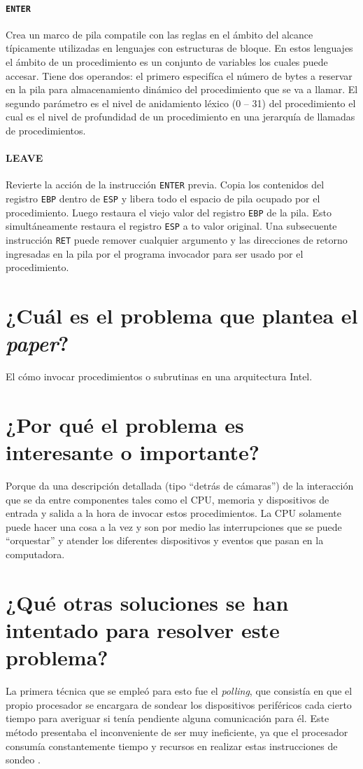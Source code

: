 \paragraph{\texttt{ENTER}}  
Crea un marco de pila compatile con las reglas en el ámbito del alcance típicamente utilizadas en lenguajes con estructuras de bloque. En estos lenguajes el ámbito de un procedimiento es un conjunto de variables los cuales puede accesar. Tiene dos operandos: el primero especifíca el número de bytes a reservar en la pila para almacenamiento dinámico del procedimiento que se va a llamar. El segundo parámetro es el nivel de anidamiento léxico (0 -- 31) del procedimiento el cual es el nivel de profundidad de un procedimiento en una jerarquía de llamadas de procedimientos.

\paragraph{LEAVE}
Revierte la acción de la instrucción \texttt{ENTER} previa. Copia los contenidos del registro \texttt{EBP} dentro de \texttt{ESP} y libera todo el espacio de pila ocupado por el procedimiento. Luego restaura el viejo valor del registro \texttt{EBP} de la pila. Esto simultáneamente restaura el registro \texttt{ESP} a to valor original. Una subsecuente instrucción \texttt{RET} puede remover cualquier argumento y las direcciones de retorno ingresadas en la pila por el programa invocador para ser usado por el procedimiento.


\section{¿Cuál es el problema que plantea el \textit{paper}?}
El cómo invocar procedimientos o subrutinas en una arquitectura Intel. 

\section{¿Por qué el problema es interesante o importante?}
Porque da una descripción detallada (tipo ``detrás de cámaras'') de la interacción que se da entre componentes tales como el CPU, memoria y dispositivos de entrada y salida a la hora de invocar estos procedimientos. La CPU solamente puede hacer una cosa a la vez y son por medio las interrupciones que se puede ``orquestar'' y atender los diferentes dispositivos y eventos que pasan en la computadora.

\section{¿Qué otras soluciones se han intentado para resolver este problema?}
La primera técnica que se empleó para esto fue el \textit{polling}, que consistía en que el propio procesador se encargara de sondear los dispositivos periféricos cada cierto tiempo para averiguar si tenía pendiente alguna comunicación para él. Este método presentaba el inconveniente de ser muy ineficiente, ya que el procesador consumía constantemente tiempo y recursos en realizar estas instrucciones de sondeo \cite{wikipedia}.
     
